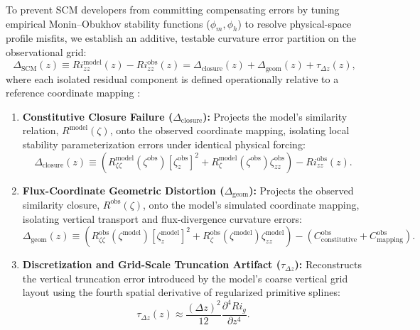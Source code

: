 To prevent SCM developers from committing compensating errors by tuning empirical Monin--Obukhov stability functions ($\phi_m, \phi_h$) to resolve physical-space profile misfits, we establish an additive, testable curvature error partition on the observational grid:
\begin{equation}
    \Delta_{\text{SCM}}(z) \equiv Ri_{zz}^{\text{model}}(z) - Ri_{zz}^{\text{obs}}(z) = \Delta_{\text{closure}}(z) + \Delta_{\text{geom}}(z) + \tau_{\Delta z}(z), \label{eq:error_partition_budget}
\end{equation}
where each isolated residual component is defined operationally relative to a reference coordinate mapping \cite{sheba2002}:
\begin{enumerate}
    \item \textbf{Constitutive Closure Failure ($\Delta_{\text{closure}}$):} Projects the model's similarity relation, $R^{\text{model}}(\zeta)$, onto the observed coordinate mapping, isolating local stability parameterization errors under identical physical forcing:
    \begin{equation}
        \Delta_{\text{closure}}(z) \equiv \left( R_{\zeta\zeta}^{\text{model}}\left(\zeta^{\text{obs}}\right) \left[ \zeta_z^{\text{obs}} \right]^2 + R_\zeta^{\text{model}}\left(\zeta^{\text{obs}}\right) \zeta_{zz}^{\text{obs}} \right) - Ri_{zz}^{\text{obs}}(z). \label{eq:delta_closure_def}
    \end{equation}
    \item \textbf{Flux-Coordinate Geometric Distortion ($\Delta_{\text{geom}}$):} Projects the observed similarity closure, $R^{\text{obs}}(\zeta)$, onto the model's simulated coordinate mapping, isolating vertical transport and flux-divergence curvature errors:
    \begin{equation}
        \Delta_{\text{geom}}(z) \equiv \left( R_{\zeta\zeta}^{\text{obs}}\left(\zeta^{\text{model}}\right) \left[ \zeta_z^{\text{model}} \right]^2 + R_\zeta^{\text{obs}}\left(\zeta^{\text{model}}\right) \zeta_{zz}^{\text{model}} \right) - \left( C_{\text{constitutive}}^{\text{obs}} + C_{\text{mapping}}^{\text{obs}} \right). \label{eq:delta_geom_def}
    \end{equation}
    \item \textbf{Discretization and Grid-Scale Truncation Artifact ($\tau_{\Delta z}$):} Reconstructs the vertical truncation error introduced by the model's coarse vertical grid layout using the fourth spatial derivative of regularized primitive splines:
    \begin{equation}
        \tau_{\Delta z}(z) \approx \frac{(\Delta z)^2}{12} \frac{\partial^4 Ri_g}{\partial z^4}. \label{eq:discretization_artifact_def}
    \end{equation}
\end{enumerate}

